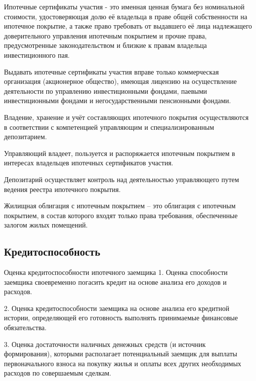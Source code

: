 \documentclass[_Banking_p2.tex]{subfiles}
\begin{document}
\begin{frame}{}
\begin{block}{Ипотечные сертификаты участия}
\quad
- это именная ценная бумага без номинальной стоимости, удостоверяющая долю её владельца в праве общей собственности на ипотечное покрытие, а также право требовать от выдавшего её лица надлежащего доверительного управления ипотечным покрытием и прочие права, предусмотренные законодательством и близкие к правам владельца инвестиционного пая. 
\end{block}
\end{frame}

\begin{frame}{}
Выдавать ипотечные сертификаты участия вправе только коммерческая организация (акционерное общество), имеющая лицензию на осуществление деятельности по управлению инвестиционными фондами, паевыми инвестиционными фондами и негосударственными пенсионными фондами. 
\end{frame}

\begin{frame}
Владение, хранение и учёт составляющих ипотечного покрытия осуществляются в соответствии с компетенцией управляющим и специализированным депозитарием. 
\end{frame}


\begin{frame}
Управляющий владеет, пользуется и распоряжается ипотечным покрытием в интересах владельцев ипотечных сертификатов участия. 

Депозитарий осуществляет контроль над деятельностью управляющего путем ведения реестра ипотечного покрытия.

\end{frame}

\begin{frame}
\begin{block}{Жилищная облигация с ипотечным покрытием }
\quad
– это облигация с ипотечным покрытием, в состав которого входят только права требования, обеспеченные залогом жилых помещений. 
\end{block}
\end{frame}


\subsection{Кредитоспособность}

\begin{frame}{Оценка кредитоспособности ипотечного заемщика}
1. Оценка способности заемщика своевременно погасить кредит на основе анализа его доходов и расходов.

2. Оценка кредитоспособности заемщика на основе анализа его кредитной истории, определяющей его готовность выполнять принимаемые финансовые обязательства.

3. Оценка достаточности наличных денежных средств (и источник формирования), которыми располагает потенциальный заемщик для выплаты первоначального взноса на покупку жилья и оплаты всех других необходимых расходов по совершаемым сделкам. 
\end{frame}
\end{document}

